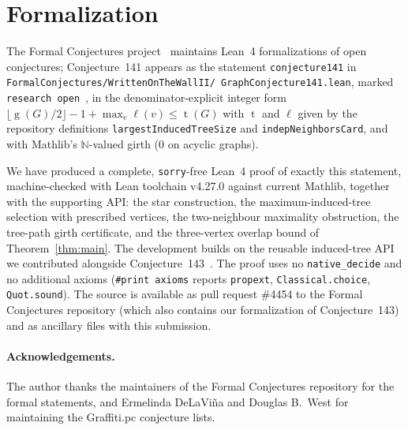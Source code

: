 \documentclass[11pt]{article}
\numberwithin{equation}{section}
\theoremstyle{remark}
\newcommand{\tr}{\operatorname{t}}
\newcommand{\gr}{\operatorname{g}}
\newcommand{\lv}{\ell}
\begin{document}
\section{Formalization}\label{sec:formal}

The Formal Conjectures project~\cite{FC} maintains Lean~4 formalizations of
open conjectures; Conjecture~141 appears as the statement
\texttt{conjecture141} in
\texttt{FormalConjectures/\allowbreak WrittenOnTheWallII/\allowbreak
GraphConjecture141.lean},
marked \texttt{research open}~\cite{FC141}, in the denominator-explicit
integer form
$\lfloor\gr(G)/2\rfloor-1+\max_v\lv(v)\le\tr(G)$
with $\tr$ and $\lv$ given by the repository definitions
\texttt{largestInducedTreeSize} and \texttt{indepNeighborsCard}, and with
Mathlib's $\mathbb{N}$-valued girth ($0$ on acyclic graphs).

We have produced a complete, \texttt{sorry}-free Lean~4 proof of exactly this
statement, machine-checked with Lean toolchain v4.27.0 against current
Mathlib, together with the supporting API: the star construction, the
maximum-induced-tree selection with prescribed vertices, the two-neighbour
maximality obstruction, the tree-path girth certificate, and the
three-vertex overlap bound of Theorem~\ref{thm:main}.  The development
builds on the reusable induced-tree API we contributed alongside
Conjecture~143~\cite{W143}.  The proof uses no \texttt{native\_decide} and no
additional axioms (\texttt{\#print axioms} reports \texttt{propext},
\texttt{Classical.choice}, \texttt{Quot.sound}).  The source is available as
pull request \#4454 to the Formal Conjectures repository (which also contains
our formalization of Conjecture~143) and as ancillary files with this
submission.

\paragraph{Acknowledgements.}
The author thanks the maintainers of the Formal Conjectures repository for
the formal statements, and Ermelinda DeLaVi\~na and Douglas B.\ West for
maintaining the Graffiti.pc conjecture lists.
\end{document}
